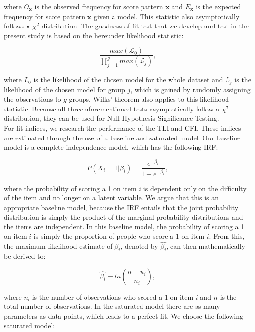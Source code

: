 \documentclass[Royal,sageapa,times,doublespace]{Manuscript-Files/sagej}
\begin{document}
where $O_{\boldsymbol{x}}$ is the observed frequency for score pattern $\boldsymbol{x}$ and $E_{\boldsymbol{x}}$ is the expected frequency for score pattern $\boldsymbol{x}$ given a model. This statistic also asymptotically follows a $\chi^2$ distribution. The goodness-of-fit test that we develop and test in the present study is based on the hereunder likelihood statistic: 

\begin{equation}
\frac{max(\mathcal{L}_0)}{\prod_{j = 1}^g max(\mathcal{L}_j)},
\end{equation}
 
where $L_0$ is the likelihood of the chosen model for the whole dataset and $L_j$ is the likelihood of the chosen model for group $j$, which is gained by randomly assigning the observations to $g$ groups. Wilks' theorem also applies to this likelihood statistic. Because all three aforementioned tests asymptotically follow a $\chi^2$ distribution, they can be used for Null Hypothesis Significance Testing. \\
\indent For fit indices, we research the performance of the TLI and CFI. These indices are estimated through the use of a baseline and saturated model. Our baseline model is a complete-independence model, which has the following IRF:

\begin{equation}
P(X_i = 1 | \beta_{i}) = \frac{e^{- \beta_{i}}}{1 + e^{- \beta_{i}}},
\end{equation}

where the probability of scoring a 1 on item $i$ is dependent only on the difficulty of the item and no longer on a latent variable. We argue that this is an appropriate baseline model, because the IRF entails that the joint probability distribution is simply the product of the marginal probability distributions and the items are independent. In this baseline model, the probability of scoring a 1 on item $i$ is simply the proportion of people who score a 1 on item $i$. From this, the maximum likelihood estimate of $\beta_{i}$, denoted by $\hat{\beta_{i}}$, can then mathematically be derived to:


\begin{equation*}
\hat{\beta_{i}} = ln(\frac{n - n_i}{n_i}), 
\end{equation*}

where $n_i$ is the number of observations who scored a 1 on item $i$ and $n$ is the total number of observations. In the saturated model there are as many parameters as data points, which leads to a perfect fit. We choose the following saturated model:
\end{document}
